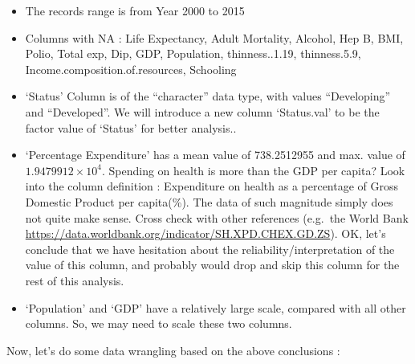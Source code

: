 \documentclass[
]{article}
\newenvironment{Shaded}{\begin{snugshade}}{\end{snugshade}}
\newcommand{\AttributeTok}[1]{\textcolor[rgb]{0.77,0.63,0.00}{#1}}
\newcommand{\CommentTok}[1]{\textcolor[rgb]{0.56,0.35,0.01}{\textit{#1}}}
\newcommand{\DecValTok}[1]{\textcolor[rgb]{0.00,0.00,0.81}{#1}}
\newcommand{\FunctionTok}[1]{\textcolor[rgb]{0.00,0.00,0.00}{#1}}
\newcommand{\NormalTok}[1]{#1}
\newcommand{\OtherTok}[1]{\textcolor[rgb]{0.56,0.35,0.01}{#1}}
\newcommand{\SpecialCharTok}[1]{\textcolor[rgb]{0.00,0.00,0.00}{#1}}
\newcommand{\StringTok}[1]{\textcolor[rgb]{0.31,0.60,0.02}{#1}}
\providecommand{\tightlist}{%
  \setlength{\itemsep}{0pt}\setlength{\parskip}{0pt}}
\begin{document}
\begin{itemize}
\tightlist
\item
  The records range is from Year 2000 to 2015
\item
  Columns with NA : Life Expectancy, Adult Mortality, Alcohol, Hep B,
  BMI, Polio, Total exp, Dip, GDP, Population, thinness..1.19,
  thinness.5.9, Income.composition.of.resources, Schooling
\item
  `Status' Column is of the ``character'' data type, with values
  ``Developing'' and ``Developed''. We will introduce a new column
  `Status.val' to be the factor value of `Status' for better analysis..
\item
  `Percentage Expenditure' has a mean value of 738.2512955 and max.
  value of \ensuremath{1.9479912\times 10^{4}}. Spending on health is
  more than the GDP per capita? Look into the column definition :
  Expenditure on health as a percentage of Gross Domestic Product per
  capita(\%). The data of such magnitude simply does not quite make
  sense. Cross check with other references (e.g.~the World Bank
  \url{https://data.worldbank.org/indicator/SH.XPD.CHEX.GD.ZS}). OK,
  let's conclude that we have hesitation about the
  reliability/interpretation of the value of this column, and probably
  would drop and skip this column for the rest of this analysis.
\item
  `Population' and `GDP' have a relatively large scale, compared with
  all other columns. So, we may need to scale these two columns.
\end{itemize}

Now, let's do some data wrangling based on the above conclusions :

\begin{Shaded}
\end{Shaded}
\end{document}
